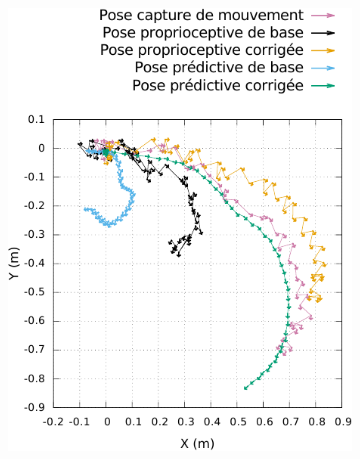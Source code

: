 \begin{figure}[htbp]
    \centerfloat
    \vspace{-0.5cm}
    \begin{subfigure}{0.29\paperwidth}
        \centering
        \includegraphics[type=pdf,ext=.pdf,read=.pdf,width=1.0\linewidth]{../plot/OdometryLWPR/grass_open_traj1_pose}
    \end{subfigure}
    \begin{subfigure}{0.29\paperwidth}
        \centering

\end{subfigure}
\end{figure}
